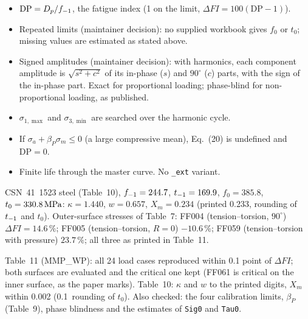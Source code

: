 \begin{itemize}
\item $\mathrm{DP}=D_p/f_{-1}$, the fatigue index (1 on the limit, $\Delta FI=100(\mathrm{DP}-1)$).
\item Repeated limits (maintainer decision): no supplied workbook gives $f_0$ or $t_0$; missing values
  are estimated as stated above.
\item Signed amplitudes (maintainer decision): with harmonics, each component amplitude is
  $\sqrt{s^2+c^2}$ of its in-phase ($s$) and $90^\circ$ ($c$) parts, with the sign of the in-phase part.
  Exact for proportional loading; phase-blind for non-proportional loading, as published.
\item $\sigma_{1,\max}$ and $\sigma_{3,\min}$ are searched over the harmonic cycle.
\item If $\sigma_a+\beta_P\sigma_m\le0$ (a large compressive mean), Eq.~(20) is undefined and $\mathrm{DP}=0$.
\item Finite life through the master curve. No \texttt{\_ext} variant.
\end{itemize}

 CSN~41~1523 steel (Table~10), $f_{-1}=244.7$, $t_{-1}=169.9$, $f_0=385.8$,
$t_0=330.8\,\mathrm{MPa}$: $\kappa=1.440$, $w=0.657$, $X_m=0.234$ (printed 0.233, rounding of $t_{-1}$ and $t_0$).
Outer-surface stresses of Table~7: FF004 (tension--torsion, $90^\circ$) $\Delta FI=14.6\,\%$; FF005
(tension--torsion, $R=0$) $-10.6\,\%$; FF059 (tension--torsion with pressure) $23.7\,\%$; all three as
printed in Table~11.

 Table~11 (MMP\_WP): all 24 load cases reproduced within 0.1 point of $\Delta FI$;
both surfaces are evaluated and the critical one kept (FF061 is critical on the inner surface, as the
paper marks). Table~10: $\kappa$ and $w$ to the printed digits, $X_m$ within 0.002 (0.1\MPa\ rounding of
$t_0$). Also checked: the four calibration limits, $\beta_P$ (Table~9), phase blindness and the
estimates of \texttt{Sig0} and \texttt{Tau0}.
